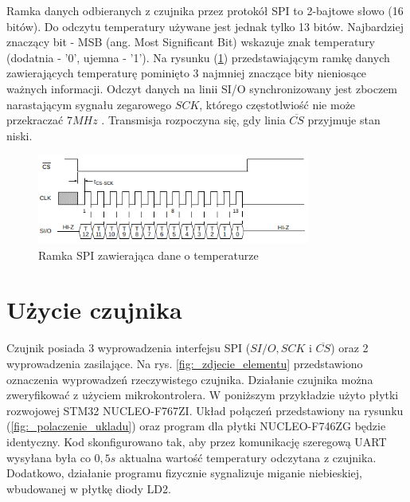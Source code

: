 \documentclass[11pt, a4paper]{article}
\begin{document}
Ramka danych odbieranych z czujnika przez protokół SPI to 2-bajtowe słowo (16 bitów). Do odczytu temperatury używane jest jednak tylko 13 bitów. Najbardziej znaczący bit - MSB (ang. Most Significant Bit) wskazuje znak temperatury (dodatnia - '0', ujemna - '1'). Na rysunku (\ref{fig:_frame}) przedstawiającym ramkę danych zawierających temperaturę pominięto 3 najmniej znaczące bity nieniosące ważnych informacji. Odczyt danych na linii SI/O synchronizowany jest zboczem narastającym sygnału zegarowego $SCK$, którego częstotlwiość nie może przekraczać $7MHz$ \cite{microchip:TC77}. Transmisja rozpoczyna się, gdy linia $\overline{CS}$ przyjmuje stan niski.

\vspace{0.25cm}
\begin{figure}[h]
    \centering
    \includegraphics[width=0.8\textwidth]{fig/TC77/zasada_dzialania/frame.png}
    \caption{Ramka SPI zawierająca dane o temperaturze \cite{microchip:TC77}}
    \label{fig:_frame}
\end{figure}
\vspace{0.25cm}

\newpage
\section{Użycie czujnika}
Czujnik posiada 3 wyprowadzenia interfejsu SPI ($SI/O, SCK$ i $\overline{CS}$) oraz 2 wyprowadzenia zasilające. Na rys. \ref{fig:_zdjecie_elementu} przedstawiono oznaczenia wyprowadzeń rzeczywistego czujnika. Działanie czujnika można zweryfikować z użyciem mikrokontrolera. W poniższym przykładzie użyto płytki rozwojowej STM32 NUCLEO-F767ZI. Układ połączeń przedstawiony na rysunku (\ref{fig:_polaczenie_ukladu}) oraz program dla płytki NUCLEO-F746ZG będzie identyczny. Kod skonfigurowano tak, aby przez komunikację szeregową UART wysyłana była co $0,5s$ aktualna wartość temperatury odczytana z czujnika. Dodatkowo, działanie programu fizycznie sygnalizuje miganie niebieskiej, wbudowanej w płytkę diody LD2.
\end{document}
